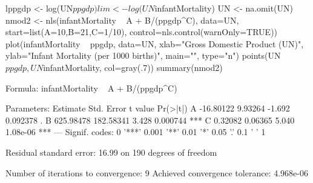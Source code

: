 \begin{Schunk}
\begin{Sinput}
 lppgdp <- log(UN$ppgdp)
 lim <- log(UN$infantMortality)
 UN <- na.omit(UN)
 nmod2 <- nls(infantMortality  ~  A + B/(ppgdp^C), data=UN, start=list(A=10,B=21,C=1/10), control=nls.control(warnOnly=TRUE))
 plot(infantMortality ~ ppgdp, data=UN, xlab="Gross Domestic Product (UN)", ylab="Infant Mortality (per 1000 births)", main="", type="n")
 points(UN$ppgdp, UN$infantMortality, col=gray(.7))
 summary(nmod2)
\end{Sinput}
\begin{Soutput}
Formula: infantMortality ~ A + B/(ppgdp^C)

Parameters:
   Estimate Std. Error t value Pr(>|t|)    
A -16.80122    9.93264  -1.692 0.092378 .  
B 625.98478  182.58341   3.428 0.000744 ***
C   0.32082    0.06365   5.040 1.08e-06 ***
---
Signif. codes:  0 '***' 0.001 '**' 0.01 '*' 0.05 '.' 0.1 ' ' 1

Residual standard error: 16.99 on 190 degrees of freedom

Number of iterations to convergence: 9 
Achieved convergence tolerance: 4.968e-06
\end{Soutput}
\end{Schunk}
